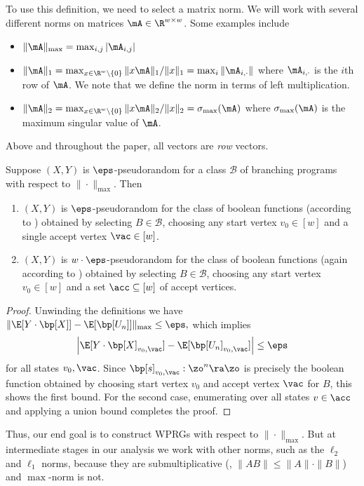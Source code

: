 To use this definition, we need to select a matrix norm. We will work with several different norms on matrices $\mA \in \R^{w\times w}$. Some examples include %
\begin{itemize}
    \item $\|\mA\|_{\max} = \max_{i,j}|\mA_{i,j}|$
    \item $\|\mA\|_{1} = \max_{x\in \R^w\setminus\{0\}}\|x\mA\|_1/\|x\|_1 = \max_i \|\mA_{i,\cdot}\|$ where $\mA_{i,\cdot}$ is the $i$th row of $\mA$. We note that we define the norm in terms of left multiplication.
    \item $\|\mA\|_2 = \max_{x\in \R^w\setminus \{0\}} \|x\mA \|_2/\|x\|_2=\sigma_{\max}(\mA)$ where $\sigma_{\max}(\mA)$ is the maximum singular value of $\mA$.
\end{itemize}
Above and throughout the paper, all vectors are \emph{row} vectors.
\begin{lemma}
Suppose $(X,Y)$ is $\eps$-pseudorandom for a class $\mathcal{B}$ of branching programs with respect to $\|\cdot\|_{\max}$. Then
\begin{enumerate}
    \item $(X,Y)$ is $\eps$-pseudorandom for the class of boolean functions (according to ) obtained by selecting $B\in \mathcal{B}$, choosing any start vertex $v_0\in[w]$ and a single accept vertex $\vac\in [w]$.
    \item $(X,Y)$ is $w\cdot \eps$-pseudorandom for the class of boolean functions (again according to ) obtained by selecting $B\in \mathcal{B}$, choosing any start vertex $v_0\in[w]$ and a set $\acc\subseteq[w]$ of accept vertices.
\end{enumerate}
\end{lemma}
\begin{proof}
Unwinding the definitions we have
$\| \E[Y\cdot \bp[X]] - \E[\bp[U_n]]\|_{\max}\leq \eps,$
which implies 
$$\left| \E[Y\cdot \bp[X]_{v_0,\vac}] - \E[\bp[U_n]_{v_0,\vac}]\right|\leq \eps$$
for all states $v_0,\vac$. Since $\bp[s]_{v_0,\vac}:\zo^n\ra \zo$ is precisely the boolean function obtained by choosing start vertex $v_0$ and accept vertex $\vac$ for $B$, this shows the first bound. For the second case, enumerating over all states $v\in \acc$ and applying a union bound completes the proof. 
\end{proof}
Thus, our end goal is to construct WPRGs with respect to $\|\cdot\|_{\max}$. But at intermediate stages in our analysis we work with other norms, such as the $\ell_2$ and $\ell_1$ norms, because they are submultiplicative (\ie, $\|AB\|\leq \|A\|\cdot\|B\|$) and $\max$-norm is not.

